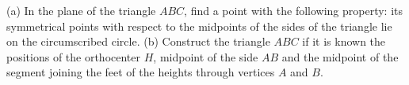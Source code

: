 (a) In the plane of the triangle $ABC$, find a point with the following property: its symmetrical points with respect to the midpoints of the sides of the triangle lie on the circumscribed circle.
(b) Construct the triangle $ABC$ if it is known the positions of the orthocenter $H$, midpoint of the side $AB$ and the midpoint of the segment joining the feet of the heights through vertices $A$ and $B$.